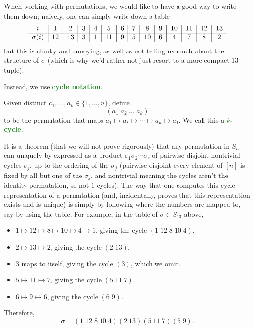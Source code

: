 \documentclass[11pt]{scrartcl}
\providecommand{\ii}{\item}
\providecommand{\vocab}[1]{{\textbf{\textcolor{ForestGreen}{#1}}}}
\begin{document}
When working with permutations, we would like to have a good way to write them down;
naively, one can simply write down a table
\begin{equation*}
    \begin{tabular}{c|c|c|c|c|c|c|c|c|c|c|c|c|c}
	$i$ & 1 & 2 & 3 & 4 & 5 & 6 & 7 & 8 & 9 & 10 & 11 & 12 & 13 \\
	\hline
	$\sigma(i)$ & 12 & 13 & 3 & 1 & 11 & 9 & 5 & 10 & 6 & 4 & 7 & 8 & 2
    \end{tabular}
\end{equation*}
but this is clunky and annoying, as well as
not telling us much about the structure of $\sigma$
(which is why we'd rather not just resort to a more compact 13-tuple).

Instead, we use \vocab{cycle notation}.
\begin{definition}[Cycles]
    \label{def:Sn-cycles}
    Given distinct $a_1,\dots,a_k\in\{1,\dots,n\}$, define
    \begin{equation*}
	(a_1\; a_2\; \dots\; a_k)
    \end{equation*}
    to be the permutation that maps
    $a_1\mapsto a_2\mapsto\cdots\mapsto a_k\mapsto a_1$.
    We call this a \vocab{$k$-cycle}.
\end{definition}

It is a theorem (that we will not prove rigorously) that
any permutation in $S_n$ can uniquely by expressed as a product
$\sigma_1\sigma_2\cdots\sigma_r$ of pairwise disjoint nontrivial cycles $\sigma_j$,
up to the ordering of the $\sigma_j$
(pairwise disjoint every element of $[n]$ is fixed by
all but one of the $\sigma_j$, and nontrivial meaning
the cycles aren't the identity permutation, so not $1$-cycles).
The way that one computes this cycle representation of a permutation
(and, incidentally, proves that this representation exists and is unique)
is simply by following where the numbers are mapped to, say by using the table.
For example, in the table of $\sigma\in S_{13}$ above,
\begin{itemize}
    \ii $1\mapsto 12\mapsto 8\mapsto 10\mapsto 4\mapsto 1$,
    giving the cycle $(1\; 12\; 8\; 10\; 4)$.
    \ii $2\mapsto13\mapsto 2$,
    giving the cycle $(2\;13)$.
    \ii $3$ maps to itself,
    giving the cycle $(3)$, which we omit.
    \ii $5\mapsto 11\mapsto 7$,
    giving the cycle $(5\;11\;7)$.
    \ii $6\mapsto 9\mapsto 6$,
    giving the cycle $(6\;9)$.
\end{itemize}
Therefore,
\begin{equation*}
    \sigma = (1\; 12\; 8\; 10\; 4)(2\;13)(5\;11\;7)(6\;9).
\end{equation*}
\end{document}
